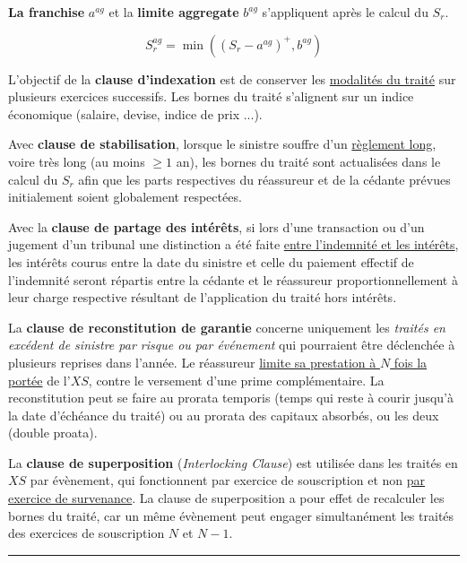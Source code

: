 \begin{f}

\textbf{La franchise} \(a^{ag}\) et la \textbf{limite aggregate}  \(b^{ag}\)  s'appliquent après le calcul du \(S_r\). 

\[
S_r^{ag} = \min\left( \left(S_r - a^{ag}  \right)^+,b^{ag}\right)  
\]
\medskip

L'objectif de la \textbf{clause d'indexation} est de conserver les \underline{modalités du traité} sur plusieurs exercices successifs.  Les bornes du traité s'alignent sur un indice économique (salaire, devise, indice de prix ...).
\medskip

Avec \textbf{clause de stabilisation}, lorsque le sinistre souffre d'un \underline{règlement long}, voire très long (au moins \(\geq 1\) an), les bornes du traité sont actualisées dans le calcul du \(S_r\) afin que les parts respectives du réassureur et de la cédante prévues initialement soient globalement respectées.
\medskip
	

Avec la \textbf{clause de partage des intérêts}, si lors d'une transaction ou d'un jugement d'un tribunal une distinction a été faite \underline{entre
		l'indemnité et les intérêts}, les intérêts courus entre la date du sinistre et celle du paiement effectif de l'indemnité seront répartis entre la cédante et le réassureur proportionnellement à
	leur charge respective résultant de l'application du traité hors intérêts.
\medskip


La \textbf{clause de reconstitution de garantie}
concerne uniquement les \emph{traités en excédent de sinistre par risque ou par événement} qui pourraient être déclenchée à plusieurs reprises dans l'année.
Le réassureur \underline{limite sa prestation à \(N \) fois la portée} de l'\(XS\), contre le versement d'une prime complémentaire. 
La reconstitution peut se faire au prorata temporis (temps qui reste à courir jusqu'à la date
d'échéance du traité) ou au prorata des capitaux absorbés, ou les deux (double proata). 

La \textbf{clause de superposition}
(\emph{Interlocking Clause})
est utilisée dans les traités en \(XS\) par évènement,
qui fonctionnent par exercice de souscription et non \underline{par exercice de survenance}.
La clause de superposition a pour effet de recalculer les bornes du traité, car un même évènement peut engager simultanément les traités des exercices de souscription \(N\) et \(N-1\).
\end{f}
\hrule

